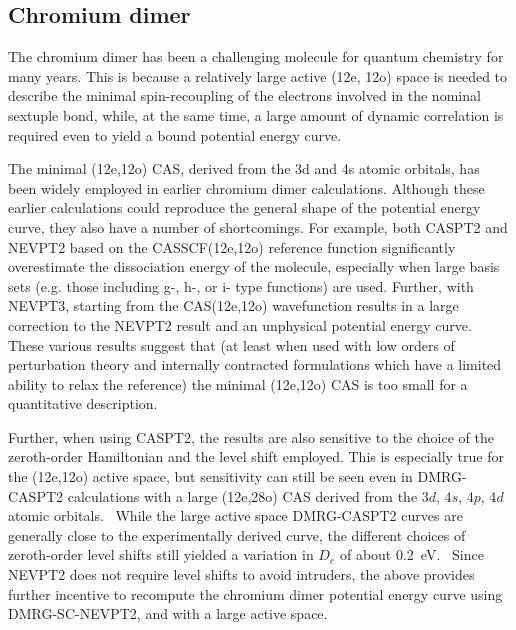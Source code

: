 \subsection{Chromium dimer}

The chromium dimer has been a challenging molecule for quantum chemistry for many years. This
is because a relatively large active (12e, 12o) space  is needed to 
describe the minimal spin-recoupling
of the electrons involved in the nominal sextuple bond, while, at the same time, a large amount of dynamic correlation is  required 
even to yield a bound potential energy curve. \cite{andersson_cr2_1994,roos_multiconfigurational_1995,roos_multiconfigurational_1996,roos_ground_2003,angeli_third-order_2006,muller_large-scale_2009,kurashige_second-order_2011,sharma_multireference_2015}

The minimal (12e,12o) CAS, derived from the 3d and 4s atomic orbitals, has been  widely employed in earlier chromium dimer calculations.\cite{andersson_cr2_1994,roos_multiconfigurational_1995,roos_multiconfigurational_1996,angeli_third-order_2006,muller_large-scale_2009,sharma_multireference_2015} Although these earlier calculations
could reproduce the general shape of the potential energy curve, they
also have a number of shortcomings.
For example,  both CASPT2\cite{andersson_cr2_1994,roos_multiconfigurational_1995,roos_multiconfigurational_1996} and NEVPT2\cite{angeli_n-electron_2001} based on the CASSCF(12e,12o) reference function  significantly overestimate the 
dissociation energy of the molecule, especially when large basis sets (e.g. those including g-, h-, or i- type functions) are used.\cite{celani_cipt2_2004,angeli_third-order_2006} Further, with NEVPT3, \cite{angeli_third-order_2006} starting
from the CAS(12e,12o) wavefunction  results in a large correction to the NEVPT2 result 
and an unphysical potential energy curve. These various results suggest 
that (at least when used with low orders of perturbation
theory and internally contracted formulations which have a limited ability to relax the reference) the minimal (12e,12o) CAS is too small for a quantitative description.

Further, when using CASPT2, the results are also  sensitive to the choice of the zeroth-order Hamiltonian and
the level shift employed.\cite{celani_cipt2_2004,ruiperez_complete_2011} This is 
especially true for the (12e,12o) active space,
but sensitivity can still be seen even in  DMRG-CASPT2 calculations with a large (12e,28o) CAS derived from the 3$d$, 4$s$, 4$p$, 4$d$ atomic orbitals.~\cite{kurashige_second-order_2011}
While the large active space DMRG-CASPT2 curves are generally close to the experimentally derived
 curve, the different choices of zeroth-order level shifts 
still yielded a variation in $D_e$ 
of about 0.2~eV.~\cite{kurashige_second-order_2011} Since NEVPT2 does not require level shifts to avoid intruders, the above provides further incentive
to recompute the chromium dimer potential energy curve using DMRG-SC-NEVPT2,
and with a large active space.

